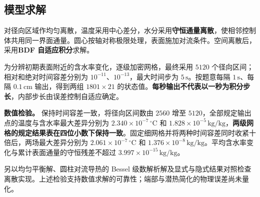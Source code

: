 \subsection{模型求解}

对径向区域作均匀离散，温度采用中心差分，水分采用\textbf{守恒通量离散}，使相邻控制体共用同一界面通量。圆心按轴对称极限处理，表面施加对流条件。空间离散后，采用\textbf{BDF 自适应积分}求解。

为分辨初期表面附近的含水率变化，逐级加密网格，最终采用 $5120$ 个径向区间；相对和绝对时间容差分别为 $10^{-11}$、$10^{-13}$，最大时间步为 $5\,\mathrm{s}$。按题意每隔 $1\,\mathrm{s}$、每隔 $0.1\,\mathrm{cm}$ 输出，得到两组 $1801\times21$ 的状态值。\textbf{每秒输出不代表以一秒为积分步长}，内部步长由误差控制自适应确定。

\noindent\textbf{数值检验。}
保持时间容差一致，将径向区间数由 $2560$ 增至 $5120$，全部规定输出点的温度与含水率最大差异分别为 $2.340\times10^{-7}\,{}^\circ\mathrm{C}$ 和 $1.828\times10^{-5}\,\mathrm{kg/kg}$，\textbf{两级网格的规定结果表在四位小数下保持一致}。固定细网格并将两种时间容差同时收紧十倍后，两场最大差异分别为 $2.061\times10^{-7}\,{}^\circ\mathrm{C}$ 和 $1.376\times10^{-8}\,\mathrm{kg/kg}$。平均含水率变化与累计表面通量的守恒残差不超过 $3.997\times10^{-15}\,\mathrm{kg/kg}$。

另以均匀平衡解、圆柱对流导热的 Bessel 级数解析解及显式与隐式结果对照检查离散实现。上述检验支持数值求解的可靠性；端部与潜热简化的物理误差尚未量化。

